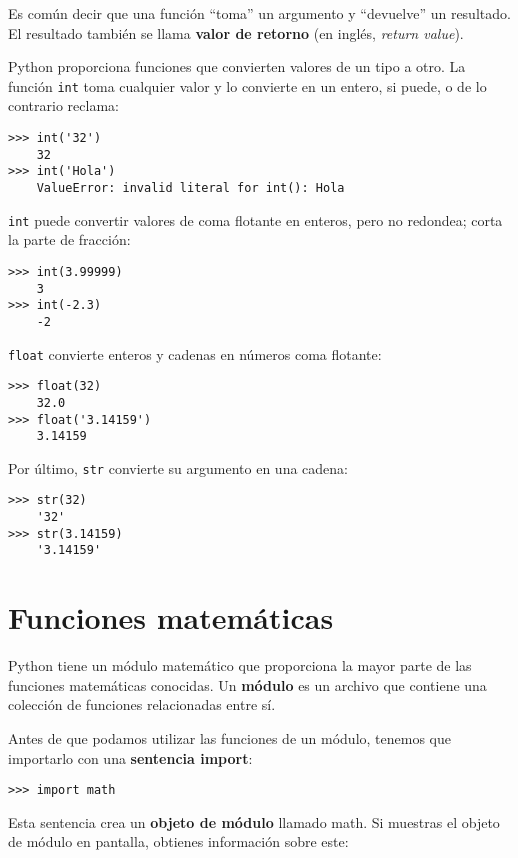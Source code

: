 \documentclass[10pt]{book}
\begin{document}
Es común decir que una función ``toma'' un argumento y ``devuelve''
un resultado.  El resultado también se llama {\bf valor de retorno} (en inglés, {\em return value}).

Python proporciona funciones que convierten valores
de un tipo a otro.  La función {\tt int} toma cualquier valor y
lo convierte en un entero, si puede, o de lo contrario reclama:

\begin{verbatim}
>>> int('32')
    32
>>> int('Hola')
    ValueError: invalid literal for int(): Hola
\end{verbatim}
%
{\tt int} puede convertir valores de coma flotante en enteros, pero
no redondea; corta la parte de fracción:

\begin{verbatim}
>>> int(3.99999)
    3
>>> int(-2.3)
    -2
\end{verbatim}
%
{\tt float} convierte enteros y cadenas en números coma
flotante:

\begin{verbatim}
>>> float(32)
    32.0
>>> float('3.14159')
    3.14159
\end{verbatim}
%
Por último, {\tt str} convierte su argumento en una cadena:

\begin{verbatim}
>>> str(32)
    '32'
>>> str(3.14159)
    '3.14159'
\end{verbatim}
%

\section{Funciones matemáticas}

Python tiene un módulo matemático que proporciona la mayor parte de las
funciones matemáticas conocidas.  Un {\bf módulo} es un archivo que contiene una
colección de funciones relacionadas entre sí.

Antes de que podamos utilizar las funciones de un módulo, tenemos que importarlo con
una {\bf sentencia import}:

\begin{verbatim}
>>> import math
\end{verbatim}
%
Esta sentencia crea un {\bf objeto de módulo} llamado math.  Si
muestras el objeto de módulo en pantalla, obtienes información sobre este:
\end{document}

